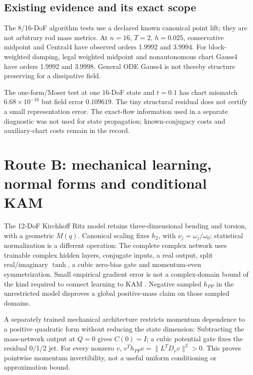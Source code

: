 \subsection{Existing evidence and its exact scope}
The 8/16-DoF algorithm tests use a declared known canonical point lift; they are not arbitrary rod mass metrics. At $n=16$, $T=2$, $h=0.025$, conservative midpoint and Central4 have observed orders 1.9992 and 3.9994. For block-weighted damping, legal weighted midpoint and nonautonomous chart Gauss4 have orders 1.9992 and 3.9998. General ODE Gauss4 is not thereby structure preserving for a dissipative field.

The one-form/Moser test at one $16$-DoF state and $t=0.1$ has chart mismatch $6.68\times10^{-16}$ but field error $0.109619$. The tiny structural residual does not certify a small representation error. The exact-flow information used in a separate diagnostic was not used for state propagation; known-conjugacy costs and auxiliary-chart costs remain in the record.

\PaperPage
\section{Route B: mechanical learning, normal forms and conditional KAM}
The 12-DoF Kirchhoff Ritz model retains three-dimensional bending and torsion, with a geometric $M(q)$. Canonical scaling fixes $h_2$, with $\nu_j=\omega_j/\omega_0$; statistical normalization is a different operation:
\EqLearningNormalization
The complete complex network uses trainable complex hidden layers, conjugate inputs, a real output, split real/imaginary $\tanh$, a cubic zero-bias gate and momentum-even symmetrization. Small empirical gradient error is not a complex-domain bound of the kind required to connect learning to KAM \citep{chen2022}. Negative sampled $h_{PP}$ in the unrestricted model disproves a global positive-mass claim on those sampled domains.

A separately trained mechanical architecture restricts momentum dependence to a positive quadratic form without reducing the state dimension:
\EqMechanicalNetwork
Subtracting the mass-network output at $Q=0$ gives $C(0)=I$; a cubic potential gate fixes the residual 0/1/2 jet. For every nonzero $v$, $v^Th_{PP}v=\|L^TD_\nu v\|^2>0$. This proves pointwise momentum invertibility, not a useful uniform conditioning or approximation bound.

